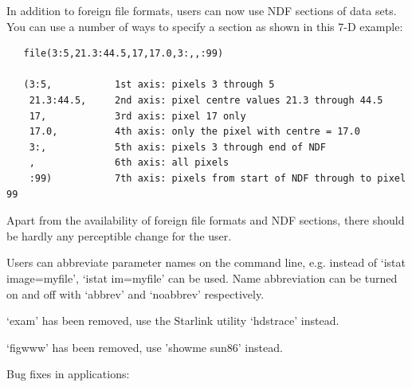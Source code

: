 \documentclass[11pt,twoside]{article}
\begin{document}
   In addition to foreign file formats, users can now use NDF sections
   of data sets. You can use a number of ways to specify a section as
   shown in this 7-D example:

\begin{verbatim}
   file(3:5,21.3:44.5,17,17.0,3:,,:99)

   (3:5,           1st axis: pixels 3 through 5
    21.3:44.5,     2nd axis: pixel centre values 21.3 through 44.5
    17,            3rd axis: pixel 17 only
    17.0,          4th axis: only the pixel with centre = 17.0
    3:,            5th axis: pixels 3 through end of NDF
    ,              6th axis: all pixels
    :99)           7th axis: pixels from start of NDF through to pixel 99
\end{verbatim}

   Apart from the availability of foreign file formats and NDF sections,
   there should be hardly any perceptible change for the user.

   Users can abbreviate parameter names on the command line, e.g. instead
   of `istat image=myfile', `istat im=myfile' can be used.
   Name abbreviation
   can be turned on and off with `abbrev' and `noabbrev' respectively.

   `exam' has been removed, use the Starlink utility `hdstrace' instead.

   `figwww' has been removed, use 'showme sun86' instead.

   Bug fixes in applications:
\end{document}
